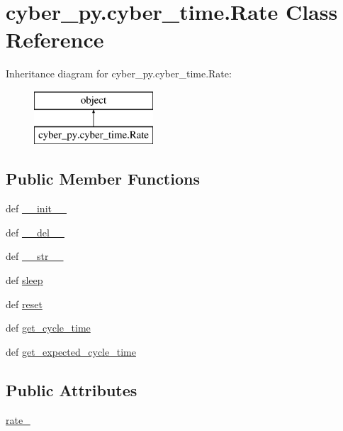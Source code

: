 \hypertarget{classcyber__py_1_1cyber__time_1_1Rate}{\section{cyber\-\_\-py.\-cyber\-\_\-time.\-Rate Class Reference}
\label{classcyber__py_1_1cyber__time_1_1Rate}
}
Inheritance diagram for cyber\-\_\-py.\-cyber\-\_\-time.\-Rate\-:\begin{figure}[H]
\begin{center}
\leavevmode
\includegraphics[height=2.000000cm]{classcyber__py_1_1cyber__time_1_1Rate}
\end{center}
\end{figure}
\subsection*{Public Member Functions}
\begin{DoxyCompactItemize}
\item 
def \hyperlink{classcyber__py_1_1cyber__time_1_1Rate_a7a975548d01fcd4b340bd9c5abb69b82}{\-\_\-\-\_\-init\-\_\-\-\_\-}
\item 
def \hyperlink{classcyber__py_1_1cyber__time_1_1Rate_a84e692b9ccae558b61b927ca38f1c494}{\-\_\-\-\_\-del\-\_\-\-\_\-}
\item 
def \hyperlink{classcyber__py_1_1cyber__time_1_1Rate_a0bacd1a2c93a2957832a06fb98b85584}{\-\_\-\-\_\-str\-\_\-\-\_\-}
\item 
def \hyperlink{classcyber__py_1_1cyber__time_1_1Rate_ab7c358d86a1832ec79983619056191f7}{sleep}
\item 
def \hyperlink{classcyber__py_1_1cyber__time_1_1Rate_a9d4ca0dc8610bc59c1c222e53704f893}{reset}
\item 
def \hyperlink{classcyber__py_1_1cyber__time_1_1Rate_aefed307f8d0770546e4ba22f777a4c2b}{get\-\_\-cycle\-\_\-time}
\item 
def \hyperlink{classcyber__py_1_1cyber__time_1_1Rate_a319c3cc27b2eaa190107415c5b1ea8b4}{get\-\_\-expected\-\_\-cycle\-\_\-time}
\end{DoxyCompactItemize}
\subsection*{Public Attributes}
\begin{DoxyCompactItemize}
\item 
\hyperlink{classcyber__py_1_1cyber__time_1_1Rate_a925c7d9c5403baab034607efe37a85b9}{rate\-\_\-}
\end{DoxyCompactItemize}


